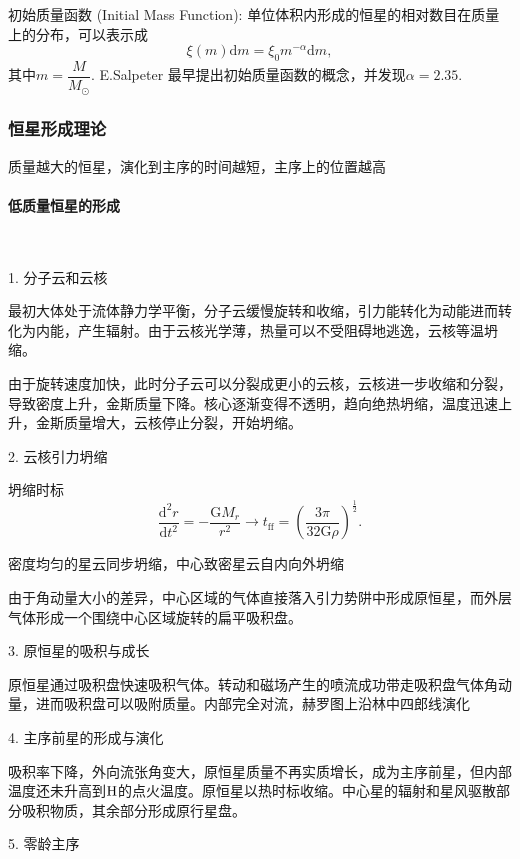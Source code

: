 \documentclass[../天体物理基础.tex]{subfiles}
\begin{document}
初始质量函数 (Initial Mass Function): 单位体积内形成的恒星的相对数目在质量上的分布，可以表示成
\begin{equation}
\xi\left(m\right)\mathrm{d}m=\xi_{0}m^{-\alpha}\mathrm{d}m,
\end{equation}
其中$m=\dfrac{M}{\unit{M_{\odot}}}$. E.Salpeter 最早提出初始质量函数的概念，并发现$\alpha=2.35$.

\subsubsection{恒星形成理论}

质量越大的恒星，演化到主序的时间越短，主序上的位置越高

\paragraph{低质量恒星的形成}~{}

1. 分子云和云核

最初大体处于流体静力学平衡，分子云缓慢旋转和收缩，引力能转化为动能进而转化为内能，产生辐射。由于云核光学薄，热量可以不受阻碍地逃逸，云核等温坍缩。

由于旋转速度加快，此时分子云可以分裂成更小的云核，云核进一步收缩和分裂，导致密度上升，金斯质量下降。核心逐渐变得不透明，趋向绝热坍缩，温度迅速上升，金斯质量增大，云核停止分裂，开始坍缩。

2. 云核引力坍缩

坍缩时标
\begin{equation}
\frac{\mathrm{d}^{2}r}{\mathrm{d}t^{2}}=-\frac{\mathrm{G}M_{r}}{r^{2}}\to t_{\text{ff}}=\left(\frac{3\pi{}}{32\mathrm{G}\rho}\right)^{\frac{1}{2}}.
\end{equation}

密度均匀的星云同步坍缩，中心致密星云自内向外坍缩

由于角动量大小的差异，中心区域的气体直接落入引力势阱中形成原恒星，而外层气体形成一个围绕中心区域旋转的扁平吸积盘。

3. 原恒星的吸积与成长

原恒星通过吸积盘快速吸积气体。转动和磁场产生的喷流成功带走吸积盘气体角动量，进而吸积盘可以吸附质量。内部完全对流，赫罗图上沿林中四郎线演化

4. 主序前星的形成与演化

吸积率下降，外向流张角变大，原恒星质量不再实质增长，成为主序前星，但内部温度还未升高到$\ce{H}$的点火温度。原恒星以热时标收缩。中心星的辐射和星风驱散部分吸积物质，其余部分形成原行星盘。

5. 零龄主序
\end{document}
